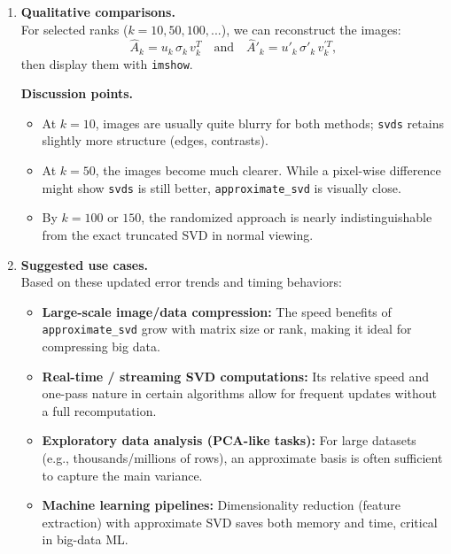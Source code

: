 \documentclass[11pt,a4paper, margin=1in]{article}
\begin{document}
\begin{enumerate}
    \item \textbf{Qualitative comparisons.} \\
    For selected ranks ($k=10, 50, 100, ...$), we can reconstruct
    the images:
    \[
      \hat{A}_{k} = u_{k}\,\sigma_{k}\,v_{k}^{T}
      \quad \text{and} \quad
      \hat{A}'_{k} = u'_{k}\,\sigma'_{k}\,v_{k}^{'T},
    \]
    then display them with \texttt{imshow}. 

    \textbf{Discussion points.}
    \begin{itemize}
      \item At $k=10$, images are usually quite blurry for both methods; 
      \texttt{svds} retains slightly more structure (edges, contrasts).
      
      \item At $k=50$, the images become much clearer. While a pixel-wise difference might show 
      \texttt{svds} is still better, \texttt{approximate\_svd} is visually close.
      
      \item By $k=100$ or $150$, the randomized approach is nearly indistinguishable 
      from the exact truncated SVD in normal viewing.
    \end{itemize}

    \item \textbf{Suggested use cases.} \\
    Based on these updated error trends and timing behaviors:
    \begin{itemize}
      \item \textbf{Large-scale image/data compression:} 
      The speed benefits of \texttt{approximate\_svd} grow with matrix size 
      or rank, making it ideal for compressing big data.
      
      \item \textbf{Real-time / streaming SVD computations:} 
      Its relative speed and one-pass nature in certain algorithms 
      allow for frequent updates without a full recomputation.
      
      \item \textbf{Exploratory data analysis (PCA-like tasks):}
      For large datasets (e.g., thousands/millions of rows), 
      an approximate basis is often sufficient to capture the main variance.
      
      \item \textbf{Machine learning pipelines:}
      Dimensionality reduction (feature extraction) with approximate SVD 
      saves both memory and time, critical in big-data ML.
    \end{itemize}

\end{enumerate}
\end{document}
